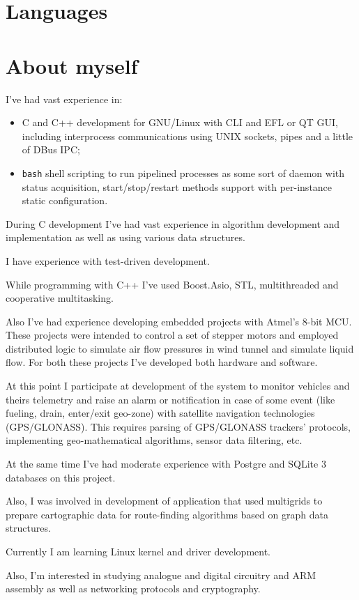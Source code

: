 \documentclass[11pt,a4paper,russian]{moderncv}
\begin{document}
\section{Languages}



\section{About myself}
\par{I've had vast experience in:}
\begin{itemize}
\item C and C++ development for GNU/Linux with CLI and EFL or QT GUI, including interprocess communications using UNIX sockets, pipes and a little of DBus IPC;
\item \texttt{bash} shell scripting to run pipelined processes as some sort of daemon with status acquisition, start/stop/restart methods support with per-instance static configuration.
\end{itemize}
\par{During C development I've had vast experience in algorithm development and implementation as well as using various data structures.}
\par{I have experience with test-driven development.}
\par{While programming with C++ I've used Boost.Asio, STL, multithreaded and cooperative multitasking.}
\par{Also I've had experience developing embedded projects with Atmel's 8-bit MCU. These projects were intended to control a set of stepper motors and employed distributed logic to simulate air flow pressures in wind tunnel and simulate liquid flow. For both these projects I've developed both hardware and software.}
\par{At this point I participate at development of the system to monitor vehicles and theirs telemetry and raise an alarm or notification in case of some event (like fueling, drain, enter/exit geo-zone) with satellite navigation technologies (GPS/GLONASS). This requires parsing of GPS/GLONASS trackers' protocols, implementing geo-mathematical algorithms, sensor data filtering, etc.}
\par{At the same time I've had moderate experience with Postgre and SQLite 3 databases on this project.}
\par{Also, I was involved in development of application that used multigrids to prepare cartographic data for route-finding algorithms based on graph data structures.}
\par{Currently I am learning Linux kernel and driver development.}
\par{Also, I'm interested in studying analogue and digital circuitry and ARM assembly as well as networking protocols and cryptography.}




\clearpage
\end{document}
